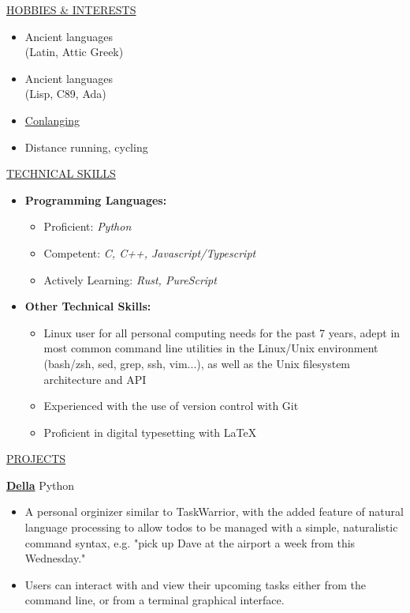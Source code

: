\documentclass[11pt]{article}
\newcommand{\betteruline}[1]{
    \uline{#1}
}
\newcommand{\sectiontitle}[1]{
    \begingroup
        \titlebold
        \betteruline{\Large\uppercase{#1}  }
        \vspace{1.7mm}
    \endgroup
}
\newcommand{\sectioncontent}[1]{
    \begingroup
        \begin{FlushLeft}
        \vspace{-3mm}
        \sffamily\small#1
        \end{FlushLeft}
    \endgroup
    \vspace{2mm}
}
\newcommand{\project}[2]{
    \begingroup
        \textbf{\small#1}
        \hfill\color{black!70}\small{#2}
    \endgroup
}
\begin{document}
\begin{paracol}{2}
{      } 

    \sectiontitle{Hobbies \& Interests}
    \sectioncontent{
      \begin{itemize}
        \item Ancient languages \\ (Latin, Attic Greek)
        \item Ancient languages \\  (Lisp, C89, Ada)
        \item \href{https://en.wikipedia.org/wiki/Constructed\_language}{Conlanging}
        \item Distance running, cycling

      \end{itemize}
    }

    \switchcolumn

    
    \sectiontitle{Technical Skills}
    \sectioncontent{
      \begin{itemize}
        \item \textbf{Programming Languages: }
          \begin{itemize}
            \item Proficient: \textit{Python} 
            \item Competent: \textit{C, C++, Javascript/Typescript}
            \item Actively Learning: \textit{Rust, PureScript}
          \end{itemize}

        \item \textbf{Other Technical Skills:}
          \begin{itemize}
            \item  Linux user for all personal computing needs for the past 7 years, adept in most common command line utilities in the Linux/Unix environment (bash/zsh, sed, grep, ssh, vim...), as well as the Unix filesystem architecture and API
            \item Experienced with the use of version control with Git
            \item Proficient in digital typesetting with \LaTeX
          \end{itemize}
      \end{itemize}
    }
    \sectiontitle{projects}
    \sectioncontent{
      \project{\href{example.com}{Della}}{Python}
        \begin{itemize}

          \item A personal orginizer similar to TaskWarrior, with the added feature of natural language processing to allow todos to be managed with a simple, naturalistic command syntax, e.g. "pick up Dave at the airport a week from this Wednesday." 
          \item Users can interact with and view their upcoming tasks either from the command line, or from a terminal graphical interface. 
        \end{itemize}
      
}
\end{paracol}
\end{document}
